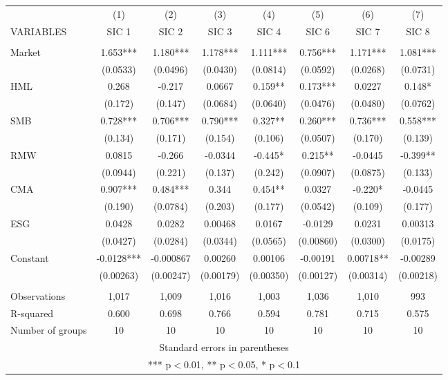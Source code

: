 \begin{tabular}{lccccccc} \hline
 & (1) & (2) & (3) & (4) & (5) & (6) & (7) \\
VARIABLES & SIC 1 & SIC 2 & SIC 3 & SIC 4 & SIC 6 & SIC 7 & SIC 8 \\ \hline
 &  &  &  &  &  &  &  \\
Market & 1.653*** & 1.180*** & 1.178*** & 1.111*** & 0.756*** & 1.171*** & 1.081*** \\
 & (0.0533) & (0.0496) & (0.0430) & (0.0814) & (0.0592) & (0.0268) & (0.0731) \\
HML & 0.268 & -0.217 & 0.0667 & 0.159** & 0.173*** & 0.0227 & 0.148* \\
 & (0.172) & (0.147) & (0.0684) & (0.0640) & (0.0476) & (0.0480) & (0.0762) \\
SMB & 0.728*** & 0.706*** & 0.790*** & 0.327** & 0.260*** & 0.736*** & 0.558*** \\
 & (0.134) & (0.171) & (0.154) & (0.106) & (0.0507) & (0.170) & (0.139) \\
RMW & 0.0815 & -0.266 & -0.0344 & -0.445* & 0.215** & -0.0445 & -0.399** \\
 & (0.0944) & (0.221) & (0.137) & (0.242) & (0.0907) & (0.0875) & (0.133) \\
CMA & 0.907*** & 0.484*** & 0.344 & 0.454** & 0.0327 & -0.220* & -0.0445 \\
 & (0.190) & (0.0784) & (0.203) & (0.177) & (0.0542) & (0.109) & (0.177) \\
ESG & 0.0428 & 0.0282 & 0.00468 & 0.0167 & -0.0129 & 0.0231 & 0.00313 \\
 & (0.0427) & (0.0284) & (0.0344) & (0.0565) & (0.00860) & (0.0300) & (0.0175) \\
Constant & -0.0128*** & -0.000867 & 0.00260 & 0.00106 & -0.00191 & 0.00718** & -0.00289 \\
 & (0.00263) & (0.00247) & (0.00179) & (0.00350) & (0.00127) & (0.00314) & (0.00218) \\
 &  &  &  &  &  &  &  \\
Observations & 1,017 & 1,009 & 1,016 & 1,003 & 1,036 & 1,010 & 993 \\
R-squared & 0.600 & 0.698 & 0.766 & 0.594 & 0.781 & 0.715 & 0.575 \\
 Number of groups & 10 & 10 & 10 & 10 & 10 & 10 & 10 \\ \hline
\multicolumn{8}{c}{ Standard errors in parentheses} \\
\multicolumn{8}{c}{ *** p$<$0.01, ** p$<$0.05, * p$<$0.1} \\
\end{tabular}
